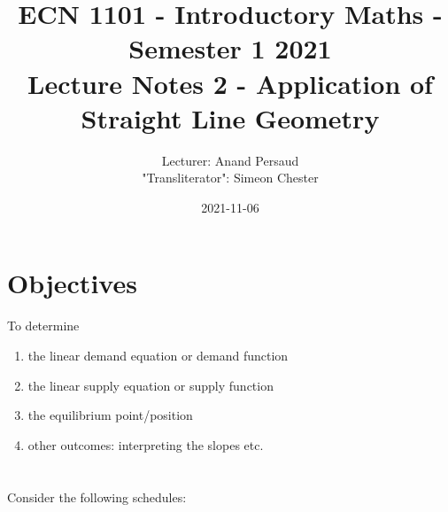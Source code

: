 \documentclass[table]{article}
\title{%
    ECN 1101 - Introductory Maths - Semester 1 2021 \\
    \large Lecture Notes 2 - Application of Straight Line Geometry \\
}
\author{Lecturer: Anand Persaud \\ "Transliterator": Simeon Chester \\}
\date{2021-11-06}
\begin{document}
\maketitle

\section*{Objectives}
To determine
\begin{enumerate}
    \item the linear demand equation or demand function
    \item the linear supply equation or supply function
    \item the equilibrium point/position
    \item other outcomes: interpreting the slopes etc.
\end{enumerate}

\section*{}
Consider the following schedules:
\end{document}
